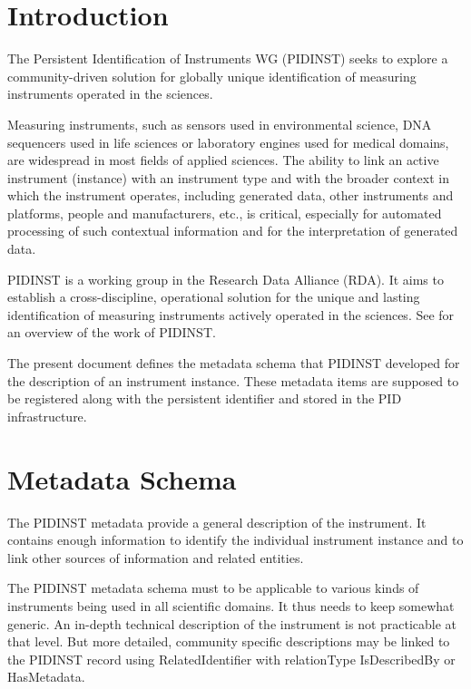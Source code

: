 \documentclass[titlepage=true,twoside=false,DIV=13]{scrartcl}
\begin{document}
\tableofcontents
\cleardoublepage
{}

\section{Introduction}

The Persistent Identification of Instruments WG (PIDINST) seeks to
explore a community-driven solution for globally unique identification
of measuring instruments operated in the sciences.

Measuring instruments, such as sensors used in environmental science,
DNA sequencers used in life sciences or laboratory engines used for
medical domains, are widespread in most fields of applied sciences.
The ability to link an active instrument (instance) with an instrument
type and with the broader context in which the instrument operates,
including generated data, other instruments and platforms, people and
manufacturers, etc., is critical, especially for automated processing
of such contextual information and for the interpretation of generated
data.

PIDINST is a working group in the Research Data Alliance (RDA).  It
aims to establish a cross-discipline, operational solution for the
unique and lasting identification of measuring instruments actively
operated in the sciences.  See \cite{pidinst2020} for an overview of
the work of PIDINST.

The present document defines the metadata schema that PIDINST
developed for the description of an instrument instance.  These
metadata items are supposed to be registered along with the persistent
identifier and stored in the PID infrastructure.

\section{Metadata Schema}

The PIDINST metadata provide a general description of the instrument.
It contains enough information to identify the individual instrument
instance and to link other sources of information and related
entities.

The PIDINST metadata schema must to be applicable to various kinds of
instruments being used in all scientific domains.  It thus needs to
keep somewhat generic.  An in-depth technical description of the
instrument is not practicable at that level.  But more detailed,
community specific descriptions may be linked to the PIDINST record
using RelatedIdentifier with relationType IsDescribedBy or
HasMetadata.
\end{document}
